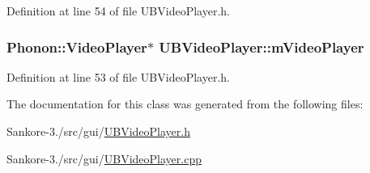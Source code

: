 Definition at line 54 of file U\-B\-Video\-Player.\-h.

\hypertarget{class_u_b_video_player_aebf986633fcfa6964c7b6cc45e691c63}{
\subsubsection[{m\-Video\-Player}]{\setlength{\rightskip}{0pt plus 5cm}Phonon\-::\-Video\-Player$\ast$ U\-B\-Video\-Player\-::m\-Video\-Player\hspace{0.3cm}{\ttfamily [protected]}}}\label{de/dd2/class_u_b_video_player_aebf986633fcfa6964c7b6cc45e691c63}


Definition at line 53 of file U\-B\-Video\-Player.\-h.



The documentation for this class was generated from the following files\-:\begin{DoxyCompactItemize}
\item 
Sankore-\/3./src/gui/\hyperlink{_u_b_video_player_8h}{U\-B\-Video\-Player.\-h}\item 
Sankore-\/3./src/gui/\hyperlink{_u_b_video_player_8cpp}{U\-B\-Video\-Player.\-cpp}\end{DoxyCompactItemize}
